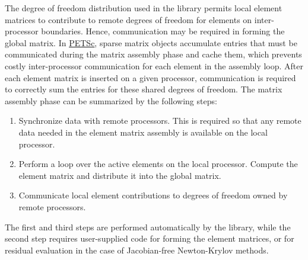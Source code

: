 \documentclass[global,twocolumn,final]{svjour}
\newcommand{\PETSc}{\href{http://www-unix.mcs.anl.gov/petsc/petsc-2}{PETSc}}
\begin{document}
The degree of freedom distribution used in the library permits local
element matrices to contribute to remote degrees of freedom for
elements on inter-processor boundaries.  Hence, communication may be
required in forming the global matrix. In \PETSc{}, sparse matrix objects
accumulate entries that must be communicated during the matrix
assembly phase and cache them, which prevents costly inter-processor
communication for each element in the assembly loop.  After each
element matrix is inserted on a given processor, communication is
required to correctly sum the entries for these shared degrees of
freedom.  The matrix assembly phase can be summarized by the
following steps:
\begin{enumerate}
  \item Synchronize data with remote processors.  This is required so
  that any remote data needed in the element matrix assembly is
  available on the local processor.
  \item Perform a loop over the active elements on the local
  processor.  Compute the element matrix and distribute it into the
  global matrix.
  \item Communicate local element contributions to degrees of freedom
  owned by remote processors.
\end{enumerate}
The first and third steps are performed automatically by the library,
while the second step requires user-supplied code for forming the
element matrices, or for residual evaluation in the case of
Jacobian-free Newton-Krylov methods.




\end{document}
